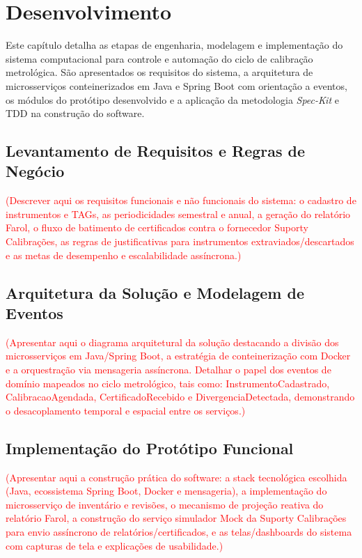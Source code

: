 \chapter{Desenvolvimento}

Este capítulo detalha as etapas de engenharia, modelagem e implementação do sistema computacional para controle e automação do ciclo de calibração metrológica. São apresentados os requisitos do sistema, a arquitetura de microsserviços conteinerizados em Java e Spring Boot com orientação a eventos, os módulos do protótipo desenvolvido e a aplicação da metodologia \textit{Spec-Kit} e TDD na construção do software.

\section{Levantamento de Requisitos e Regras de Negócio}

\textcolor{red}{(Descrever aqui os requisitos funcionais e não funcionais do sistema: o cadastro de instrumentos e TAGs, as periodicidades semestral e anual, a geração do relatório Farol, o fluxo de batimento de certificados contra o fornecedor Suporty Calibrações, as regras de justificativas para instrumentos extraviados/descartados e as metas de desempenho e escalabilidade assíncrona.)}

\section{Arquitetura da Solução e Modelagem de Eventos}

\textcolor{red}{(Apresentar aqui o diagrama arquitetural da solução destacando a divisão dos microsserviços em Java/Spring Boot, a estratégia de conteinerização com Docker e a orquestração via mensageria assíncrona. Detalhar o papel dos eventos de domínio mapeados no ciclo metrológico, tais como: InstrumentoCadastrado, CalibracaoAgendada, CertificadoRecebido e DivergenciaDetectada, demonstrando o desacoplamento temporal e espacial entre os serviços.)}

\section{Implementação do Protótipo Funcional}

\textcolor{red}{(Apresentar aqui a construção prática do software: a stack tecnológica escolhida (Java, ecossistema Spring Boot, Docker e mensageria), a implementação do microsserviço de inventário e revisões, o mecanismo de projeção reativa do relatório Farol, a construção do serviço simulador Mock da Suporty Calibrações para envio assíncrono de relatórios/certificados, e as telas/dashboards do sistema com capturas de tela e explicações de usabilidade.)}


